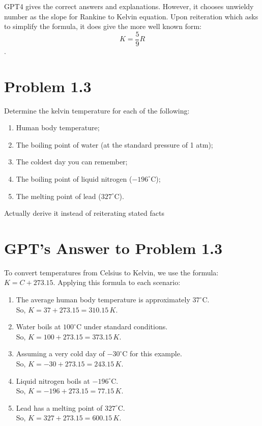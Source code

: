 \documentclass[12pt]{article}
\begin{document}
GPT4 gives the correct answers and explanations. However, it chooses unwieldy number as the slope for Rankine to Kelvin equation. Upon reiteration which asks to simplify the formula, it does give the more well known form: $$K = \frac{5}{9}R$$.

\section*{Problem 1.3}

Determine the kelvin temperature for each of the following:

\begin{enumerate}
    \item[(a)] Human body temperature;
    \item[(b)] The boiling point of water (at the standard pressure of 1 atm);
    \item[(c)] The coldest day you can remember;
    \item[(d)] The boiling point of liquid nitrogen ($-196^\circ$C);
    \item[(e)] The melting point of lead ($327^\circ$C).
\end{enumerate}

Actually derive it instead of reiterating stated facts

\section*{GPT's Answer to Problem 1.3}

To convert temperatures from Celsius to Kelvin, we use the formula: $K = C + 273.15$. Applying this formula to each scenario:

\begin{enumerate}
    \item[(a)] The average human body temperature is approximately $37^\circ$C. \\
    So, $K = 37 + 273.15 = 310.15\,K$.

    \item[(b)] Water boils at $100^\circ$C under standard conditions. \\
    So, $K = 100 + 273.15 = 373.15\,K$.

    \item[(c)] Assuming a very cold day of $-30^\circ$C for this example. \\
    So, $K = -30 + 273.15 = 243.15\,K$.

    \item[(d)] Liquid nitrogen boils at $-196^\circ$C. \\
    So, $K = -196 + 273.15 = 77.15\,K$.

    \item[(e)] Lead has a melting point of $327^\circ$C. \\
    So, $K = 327 + 273.15 = 600.15\,K$.
\end{enumerate}
\end{document}
